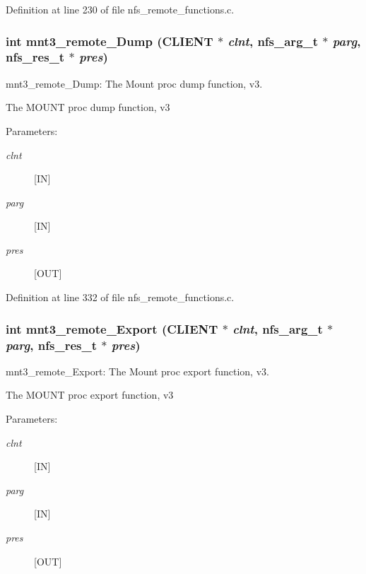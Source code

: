 Definition at line 230 of file nfs\_\-remote\_\-functions.c.
\subsubsection[{mnt3\_\-remote\_\-Dump}]{\setlength{\rightskip}{0pt plus 5cm}int mnt3\_\-remote\_\-Dump (CLIENT $\ast$ {\em clnt}, \/  nfs\_\-arg\_\-t $\ast$ {\em parg}, \/  nfs\_\-res\_\-t $\ast$ {\em pres})}\label{group__MNTprocs_gfb40d52403d9e2402412ec40e47c2090}


mnt3\_\-remote\_\-Dump: The Mount proc dump function, v3.

The MOUNT proc dump function, v3

\begin{Desc}
\item[Parameters:]
\begin{description}
\item[{\em clnt}][IN] \item[{\em parg}][IN] \item[{\em pres}][OUT] \end{description}
\end{Desc}


Definition at line 332 of file nfs\_\-remote\_\-functions.c.
\subsubsection[{mnt3\_\-remote\_\-Export}]{\setlength{\rightskip}{0pt plus 5cm}int mnt3\_\-remote\_\-Export (CLIENT $\ast$ {\em clnt}, \/  nfs\_\-arg\_\-t $\ast$ {\em parg}, \/  nfs\_\-res\_\-t $\ast$ {\em pres})}\label{group__MNTprocs_g03057430f8bcb74bbec5159f95cde37b}


mnt3\_\-remote\_\-Export: The Mount proc export function, v3.

The MOUNT proc export function, v3

\begin{Desc}
\item[Parameters:]
\begin{description}
\item[{\em clnt}][IN] \item[{\em parg}][IN] \item[{\em pres}][OUT] \end{description}
\end{Desc}


